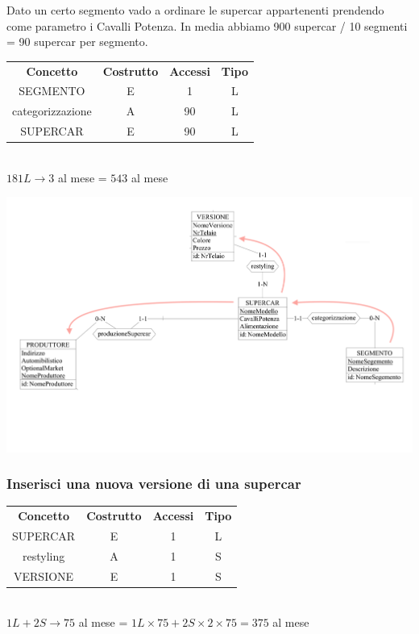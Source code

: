 \documentclass[11pt]{article}
\begin{document}
Dato un certo segmento vado a ordinare le supercar appartenenti prendendo come
parametro i Cavalli Potenza. In media abbiamo 900 supercar / 10 segmenti = 90
supercar per segmento.

\begin{table}[H]
    \centering
    \begin{tabular}{c c c c }
        \rowcolor{red!20!}
        \textbf{Concetto} & \textbf{Costrutto} & \textbf{Accessi} &
        \textbf{Tipo}\\
        SEGMENTO & E & 1 & L \\
        categorizzazione & A & 90 & L \\
        SUPERCAR & E & 90 & L \\
    \end{tabular}\\
    \( 181L  \rightarrow  3 \) al mese = \( 543 \) al mese
\end{table}

\begin{center}
    \includegraphics[width=\linewidth]{images/navigationSchemes/supercarSegmento.png}
\end{center}

\subsubsection{Inserisci una nuova versione di una supercar} 

\begin{table}[H]
    \centering
    \begin{tabular}{c c c c}
        \rowcolor{red!20!}
        \textbf{Concetto} & \textbf{Costrutto} & \textbf{Accessi} &
        \textbf{Tipo}\\
        SUPERCAR & E & 1 & L \\
        restyling & A & 1 & S \\
        VERSIONE & E & 1 & S \\
    \end{tabular}\\
    \( 1L + 2S \rightarrow 75 \) al mese = \( 1L \times 75 + 2S \times 2 \times
    75 = 375 \) al mese
\end{table}
\end{document}
